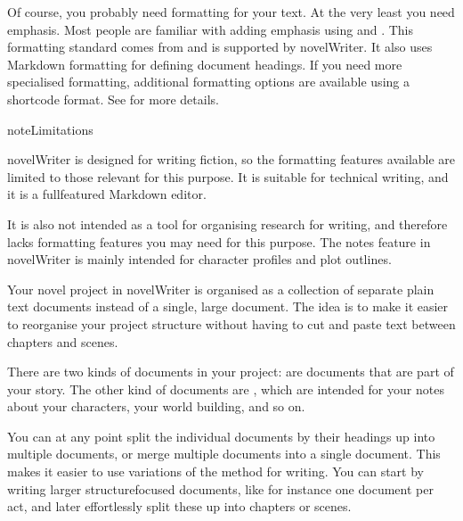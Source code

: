 \documentclass[a4paper,11pt,english]{sphinxmanual}
\begin{document}
\sphinxAtStartPar
Of course, you probably need  formatting for your text. At the very least you need emphasis.
Most people are familiar with adding emphasis using  and . This
formatting standard comes from  and is supported by novelWriter. It also uses Markdown
formatting for defining document headings. If you need more specialised formatting, additional
formatting options are available using a shortcode format. See {\hyperref[\detokenize{usage_format:a-fmt-shortcodes}]{}} for more
details.

\begin{sphinxadmonition}{note}{Limitations}

\sphinxAtStartPar
novelWriter is designed for writing fiction, so the formatting features available are limited to
those relevant for this purpose. It is  suitable for technical writing, and it is  a
full\sphinxhyphen{}featured Markdown editor.

\sphinxAtStartPar
It is also not intended as a tool for organising research for writing, and therefore lacks
formatting features you may need for this purpose. The notes feature in novelWriter is mainly
intended for character profiles and plot outlines.
\end{sphinxadmonition}

\sphinxAtStartPar
Your novel project in novelWriter is organised as a collection of separate plain text documents
instead of a single, large document. The idea is to make it easier to reorganise your project
structure without having to cut and paste text between chapters and scenes.

\sphinxAtStartPar
There are two kinds of documents in your project: {\hyperref[\detokenize{int_glossary:term-Novel-Documents}]{}} are documents that are
part of your story. The other kind of documents are {\hyperref[\detokenize{int_glossary:term-Project-Notes}]{}}, which are intended for
your notes about your characters, your world building, and so on.

\sphinxAtStartPar
You can at any point split the individual documents by their headings up into multiple documents,
or merge multiple documents into a single document. This makes it easier to use variations of the
 method for writing. You can start by writing larger structure\sphinxhyphen{}focused documents, like
for instance one document per act, and later effortlessly split these up into chapters or scenes.
\end{document}
